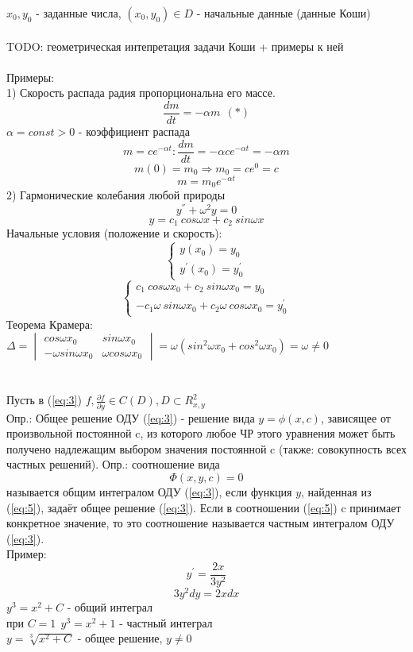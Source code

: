 \documentclass[14pt]{extarticle}
\begin{document}
$x_0, y_0$ - заданные числа, $(x_0, y_0) \in D$ - начальные данные (данные
Коши)
\\\\
TODO: геометрическая интепретация задачи Коши + примеры к ней
\\\\
Примеры:\\
1) Скорость распада радия пропорциональна его массе. 
\begin{equation*} \label{eq:*}
    \frac{dm}{dt} = -\alpha m \ \ (*)
\end{equation*}
$\alpha = const > 0$ - коэффициент распада\\
$$m = c e^{-\alpha t} : \frac{dm}{dt} = -\alpha ce^{-\alpha t} = -\alpha m$$
$$m(0) = m_0 \Rightarrow m_0 = c e^0 = c$$
$$m = m_0 e^{-\alpha t}$$
2) Гармонические колебания любой природы
$$y^{''} + \omega^2 y = 0$$
$$y = c_1 \ cos \omega x + c_2 \ sin \omega x$$
Начальные условия (положение и скорость):\\
\begin{equation*}
    \begin{cases}
        y(x_0) = y_0 \\
        y^{'}(x_0) = y^{'}_0
    \end{cases}
\end{equation*}
\begin{equation*}
    \begin{cases}
        c_1 \ cos \omega x_0 + c_2 \ sin \omega x_0 = y_0\\
        -c_1 \omega\ sin \omega x_0 + c_2 \omega \ cos \omega x_0 = y^{'}_0
    \end{cases}
\end{equation*}
Теорема Крамера: $\Delta = 
\begin{vmatrix}
    cos \omega x_0 & sin \omega x_0 \\
    - \omega sin \omega x_0 & \omega cos \omega x_0 
\end{vmatrix} = \omega (sin^2 \omega x_0 + cos^2 \omega x_0) = \omega \neq 0$
\\\\\\
Пусть в (\ref{eq:3}) $f, \frac{\partial f}{\partial y} \in C(D), 
D \subset R^2_{x, y}$\\
Опр.: Общее решение ОДУ (\ref{eq:3}) - решение вида $y = \phi(x,c)$, 
зависящее от произвольной постоянной c, из которого любое ЧР этого уравнения
может быть получено надлежащим выбором значения постоянной c
(также: совокупность всех частных решений). 
Опр.: соотношение вида 
\begin{equation} \label{eq:5}
    \Phi(x, y, c) = 0    
\end{equation} называется общим интегралом ОДУ (\ref{eq:3}), если 
функция $y$, найденная из (\ref{eq:5}), задаёт общее решение (\ref{eq:3}). 
Если в соотношении (\ref{eq:5}) c принимает конкретное значение, то 
это соотношение называется частным интегралом ОДУ (\ref{eq:3}).\\
Пример:\\
$$y^{'} = \frac{2x}{3y^2}$$
$$3y^2dy = 2xdx$$
$y^3 = x^2 + C$ - общий интеграл \\ 
при $C=1\ \ y^3 = x^2 + 1$ - частный интеграл \\
$y = \sqrt[3]{x^2 + C}$ - общее решение, $y \neq 0$ 
\end{document}
